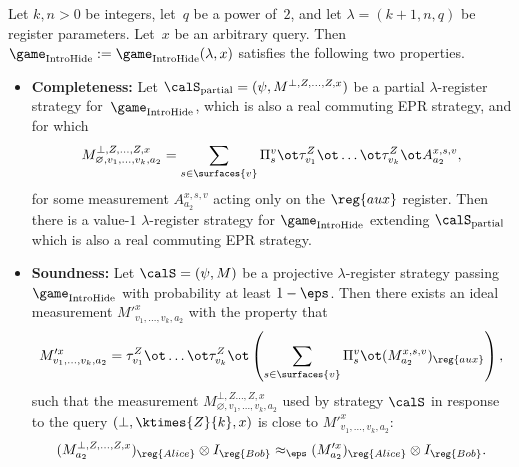 \begin{theorem}  \label{thm:ihide}
Let $k, n >0$ be integers, let~$q$ be a power of~$2$,
and let $\lambda = (k+1, n, q)$ be register parameters.
Let~$x$ be an arbitrary query.
Then $\game_{\mathrm{IntroHide}} := \game_{\mathrm{IntroHide}}(\lambda, x)$
satisfies the following two properties.
  \begin{itemize}
  \item[$\circ$]\textbf{Completeness:}
    Let $\calS_{\mathrm{partial}} = (\psi, M^{\bot, Z, \dots, Z, x})$ be a partial
    $\lambda$-register strategy for~$\game_{\mathrm{IntroHide}}$, which
    is also a real commuting EPR strategy, and for which
    \[ M^{\bot, Z, \dots, Z, x}_{\varnothing, v_1, \dots, v_k, a_2} =
      \sum_{s \in \surfaces{v}} \Pi^{v}_s \ot \tau^Z_{v_1} \ot \dots \ot
      \tau^Z_{v_k} \ot A^{x,s,v}_{a_2}, \]
    for some measurement $A^{x,s,v}_{a_2}$ acting only on the
    $\reg{aux}$ register. Then there is a value-$1$ $\lambda$-register strategy for $\game_{\mathrm{IntroHide}}$
    extending $\calS_{\mathrm{partial}}$ which is also a real commuting EPR strategy.
    \item[$\circ$]\textbf{Soundness:}
      Let $\calS = (\psi, M)$ be a projective
      $\lambda$-register strategy
      passing $\game_{\mathrm{IntroHide}}$ with probability at least $1-\eps$.
      Then there exists an ideal measurement $M'^x_{v_1, \ldots, v_k, a_2}$ with
      the property that
      \[ M'^{ x}_{v_1, \dots, v_k, a_2} = 
        \tau^Z_{v_1} \ot \dots \ot \tau^Z_{v_k} \ot \left( \sum_{s \in \surfaces{v}} \Pi^{v}_s \ot
          (M^{x, s, v}_{a_2})_{\reg{aux}}\right), \]
      such that  the measurement $M^{\bot, Z\dots, Z, x}_{\varnothing,
        v_1, \dots, v_k, a_2}$ used by strategy $\calS$ in
      response to the query $(\bot, \ktimes{Z}{k}, x)$  is close to
      $M'^x_{v_1, \dots, v_k, a_2}$:
      \[ (M_{a_2}^{\bot, Z, \dots, Z, x})_{\reg{Alice}} \otimes I_{\reg{Bob}} \approx_\eps (M'^x_{a_2})_{\reg{Alice}} \otimes I_{\reg{Bob}}. \]
    \end{itemize}
  \end{theorem}
